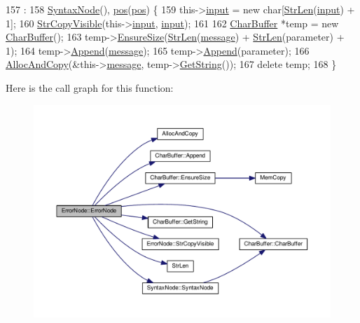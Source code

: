 \begin{DoxyCode}
157                                                                                            :
158     \hyperlink{classSyntaxNode_ac94372d402f38a118b4e8cd20ba7e520}{SyntaxNode}(), \hyperlink{classErrorNode_a2f9577d7885985f6a5671a14d64a75cf}{pos}(\hyperlink{classErrorNode_a2f9577d7885985f6a5671a14d64a75cf}{pos}) \{
159     this->\hyperlink{classErrorNode_ac2cc563162c10fff090113340184bb4b}{input} = \textcolor{keyword}{new} \textcolor{keywordtype}{char}[\hyperlink{clib_8h_a67ec56eb98b49515d35005a5b3bf9a32}{StrLen}(\hyperlink{classErrorNode_ac2cc563162c10fff090113340184bb4b}{input}) + 1];
160     \hyperlink{classErrorNode_a2e51822b04905fc867d13546af61abb8}{StrCopyVisible}(this->\hyperlink{classErrorNode_ac2cc563162c10fff090113340184bb4b}{input}, \hyperlink{classErrorNode_ac2cc563162c10fff090113340184bb4b}{input});
161 
162     \hyperlink{classCharBuffer}{CharBuffer} *temp = \textcolor{keyword}{new} \hyperlink{classCharBuffer}{CharBuffer}();
163     temp->\hyperlink{classCharBuffer_ad1907009b5ad136692b989fa96bf2f7e}{EnsureSize}(\hyperlink{clib_8h_a67ec56eb98b49515d35005a5b3bf9a32}{StrLen}(\hyperlink{classErrorNode_abd0f6fbd4876d013fbb7b6a9d5ce673e}{message}) + \hyperlink{clib_8h_a67ec56eb98b49515d35005a5b3bf9a32}{StrLen}(parameter) + 1);
164     temp->\hyperlink{classCharBuffer_a045b38735f7b3007c1b98d3d7b7feafe}{Append}(\hyperlink{classErrorNode_abd0f6fbd4876d013fbb7b6a9d5ce673e}{message});
165     temp->\hyperlink{classCharBuffer_a045b38735f7b3007c1b98d3d7b7feafe}{Append}(parameter);
166     \hyperlink{clib_8h_a5bed05c70cb17e541fee570b5dc32e1a}{AllocAndCopy}(&this->\hyperlink{classErrorNode_abd0f6fbd4876d013fbb7b6a9d5ce673e}{message}, temp->\hyperlink{classCharBuffer_a7dfd3feaaf80f318ba44efe15b1ec44b}{GetString}());
167     \textcolor{keyword}{delete} temp;
168 \}
\end{DoxyCode}


Here is the call graph for this function\+:
\nopagebreak
\begin{figure}[H]
\begin{center}
\leavevmode
\includegraphics[width=350pt]{d7/dc9/classErrorNode_a1c3d4afac02da7fcc0cec125a7ac03ba_cgraph}
\end{center}
\end{figure}




